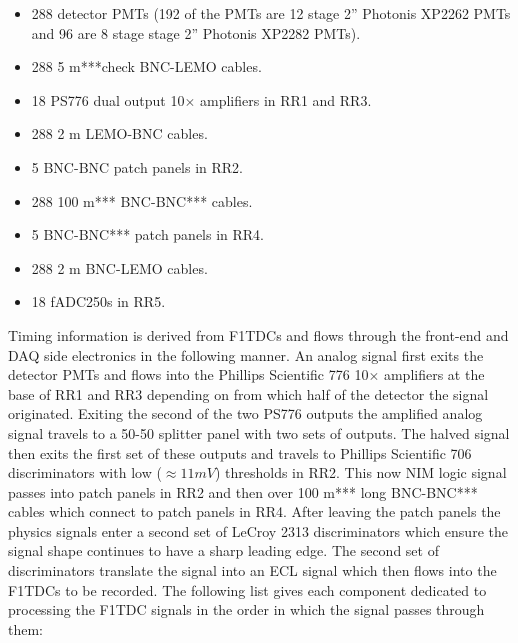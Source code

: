 \documentclass[oneside]{book}   %
\begin{document}
\begin{itemize}\itemsep6pt \parskip0pt 
	\item 288 detector PMTs (192 of the PMTs are 12 stage 2'' Photonis XP2262 PMTs and 96 are 8 stage stage 2'' Photonis XP2282 PMTs).
	\item 288 5 m***check BNC-LEMO cables. 
	\item 18 PS776 dual output 10$\times$ amplifiers in RR1 and RR3.
	\item 288 2 m LEMO-BNC cables. 
	\item 5 BNC-BNC patch panels in RR2. 
	\item 288 100 m*** BNC-BNC*** cables. 
	\item 5 BNC-BNC*** patch panels in RR4. 
	\item 288 2 m BNC-LEMO cables. 
	\item 18 fADC250s in RR5.
\end{itemize}

Timing information is derived from F1TDCs and flows through the front-end and DAQ side electronics in the following manner. An analog signal first exits the detector PMTs and flows into the Phillips Scientific 776 10$\times$ amplifiers at the base of RR1 and RR3 depending on from which half of the detector the signal originated. Exiting the second of the two PS776 outputs the amplified analog signal travels to a 50-50 splitter panel with two sets of outputs. The halved signal then exits the first set of these outputs and travels to Phillips Scientific 706 discriminators with low ($\approx 11 mV$) thresholds in RR2. This now NIM logic signal passes into patch panels in RR2 and then over 100 m*** long BNC-BNC*** cables which connect to patch panels in RR4. After leaving the patch panels the physics signals enter a second set of LeCroy 2313 discriminators which ensure the signal shape continues to have a sharp leading edge. The second set of discriminators translate the signal into an ECL signal which then flows into the F1TDCs to be recorded. The following list gives each component dedicated to processing the F1TDC signals in the order in which the signal passes through them:\\
\end{document}
